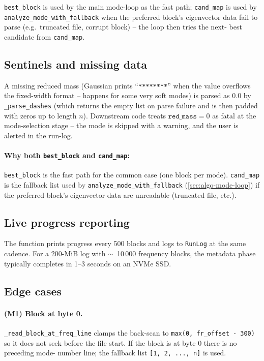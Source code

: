 \documentclass[10pt,a4paper,twoside]{article}
\newcommand{\fn}[1]{\texttt{#1}}
\begin{document}
\fn{best\_block} is used by the main mode-loop as the fast path;
\fn{cand\_map} is used by \fn{analyze\_mode\_with\_fallback}
when the preferred block's eigenvector data fail to parse (e.g.\
truncated file, corrupt block) -- the loop then tries the next-
best candidate from \fn{cand\_map}.

\subsection{Sentinels and missing data}

A missing reduced mass (Gaussian prints ``\texttt{********}'' when
the value overflows the fixed-width format -- happens for some very
soft modes) is parsed as $0.0$ by \fn{\_parse\_dashes} (which
returns the empty list on parse failure and is then padded with
zeros up to length $n$). Downstream code treats $\texttt{red\_mass}
= 0$ as fatal at the mode-selection stage -- the mode is skipped
with a warning, and the user is alerted in the run-log.

\paragraph{Why both \fn{best\_block} and \fn{cand\_map}:}
\fn{best\_block} is the fast path for the common case (one block per
mode). \fn{cand\_map} is the fallback list used by
\fn{analyze\_mode\_with\_fallback} (\cref{sec:algo-mode-loop}) if
the preferred block's eigenvector data are unreadable (truncated
file, etc.).

\subsection{Live progress reporting}

The function prints progress every 500 blocks and logs to
\fn{RunLog} at the same cadence. For a 200-MiB log with $\sim$~10\,000
frequency blocks, the metadata phase typically completes in
1--3 seconds on an NVMe SSD.

\subsection{Edge cases}

\paragraph{(M1) Block at byte 0.}
\fn{\_read\_block\_at\_freq\_line} clamps the back-scan to
\texttt{max(0, fr\_offset - 300)} so it does not seek before the
file start. If the block is at byte 0 there is no preceding mode-
number line; the fallback list \texttt{[1, 2, ..., n]} is used.
\end{document}
